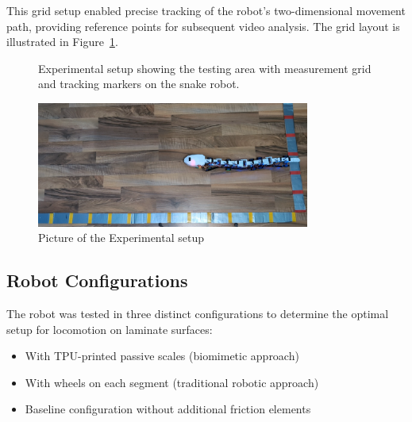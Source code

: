 \documentclass[12pt,a4paper]{report}
\begin{document}
This grid setup enabled precise tracking of the robot's two-dimensional movement path, providing reference points for subsequent video analysis. The grid layout is illustrated in Figure~\ref{fig:tracking_setup}.

\begin{figure}[H]
    \centering
    \caption{Experimental setup showing the testing area with measurement grid and tracking markers on the snake robot.}
    \label{fig:tracking_setup}
\end{figure}

\begin{figure}[h]
\centering
\includegraphics[width=0.8\textwidth]{media/testing.png}
\caption{Picture of the Experimental setup}
\end{figure}



\subsection{Robot Configurations}
The robot was tested in three distinct configurations to determine the optimal setup for locomotion on laminate surfaces:
\begin{itemize}
    \item With TPU-printed passive scales (biomimetic approach)
    \item With wheels on each segment (traditional robotic approach)
    \item Baseline configuration without additional friction elements
\end{itemize}
\end{document}
